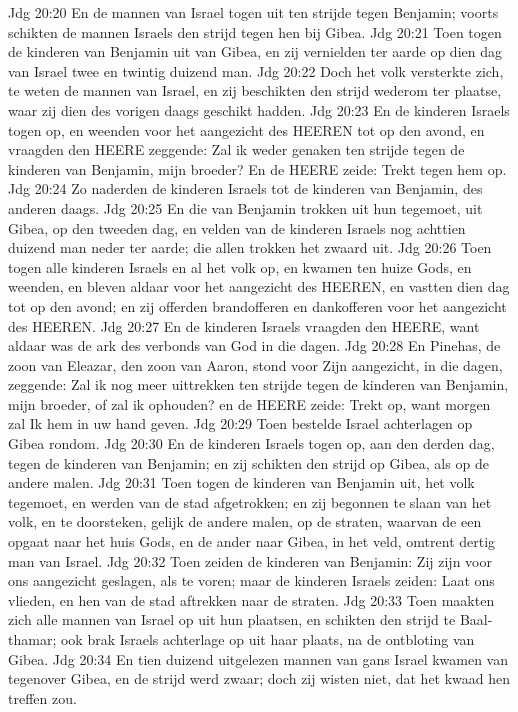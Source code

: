 Jdg 20:20  En de mannen van Israel togen uit ten strijde tegen Benjamin; voorts schikten de mannen Israels den strijd tegen hen bij Gibea.
Jdg 20:21  Toen togen de kinderen van Benjamin uit van Gibea, en zij vernielden ter aarde op dien dag van Israel twee en twintig duizend man.
Jdg 20:22  Doch het volk versterkte zich, te weten de mannen van Israel, en zij beschikten den strijd wederom ter plaatse, waar zij dien des vorigen daags geschikt hadden.
Jdg 20:23  En de kinderen Israels togen op, en weenden voor het aangezicht des HEEREN tot op den avond, en vraagden den HEERE zeggende: Zal ik weder genaken ten strijde tegen de kinderen van Benjamin, mijn broeder? En de HEERE zeide: Trekt tegen hem op.
Jdg 20:24  Zo naderden de kinderen Israels tot de kinderen van Benjamin, des anderen daags.
Jdg 20:25  En die van Benjamin trokken uit hun tegemoet, uit Gibea, op den tweeden dag, en velden van de kinderen Israels nog achttien duizend man neder ter aarde; die allen trokken het zwaard uit.
Jdg 20:26  Toen togen alle kinderen Israels en al het volk op, en kwamen ten huize Gods, en weenden, en bleven aldaar voor het aangezicht des HEEREN, en vastten dien dag tot op den avond; en zij offerden brandofferen en dankofferen voor het aangezicht des HEEREN.
Jdg 20:27  En de kinderen Israels vraagden den HEERE, want aldaar was de ark des verbonds van God in die dagen.
Jdg 20:28  En Pinehas, de zoon van Eleazar, den zoon van Aaron, stond voor Zijn aangezicht, in die dagen, zeggende: Zal ik nog meer uittrekken ten strijde tegen de kinderen van Benjamin, mijn broeder, of zal ik ophouden? en de HEERE zeide: Trekt op, want morgen zal Ik hem in uw hand geven.
Jdg 20:29  Toen bestelde Israel achterlagen op Gibea rondom.
Jdg 20:30  En de kinderen Israels togen op, aan den derden dag, tegen de kinderen van Benjamin; en zij schikten den strijd op Gibea, als op de andere malen.
Jdg 20:31  Toen togen de kinderen van Benjamin uit, het volk tegemoet, en werden van de stad afgetrokken; en zij begonnen te slaan van het volk, en te doorsteken, gelijk de andere malen, op de straten, waarvan de een opgaat naar het huis Gods, en de ander naar Gibea, in het veld, omtrent dertig man van Israel.
Jdg 20:32  Toen zeiden de kinderen van Benjamin: Zij zijn voor ons aangezicht geslagen, als te voren; maar de kinderen Israels zeiden: Laat ons vlieden, en hen van de stad aftrekken naar de straten.
Jdg 20:33  Toen maakten zich alle mannen van Israel op uit hun plaatsen, en schikten den strijd te Baal-thamar; ook brak Israels achterlage op uit haar plaats, na de ontbloting van Gibea.
Jdg 20:34  En tien duizend uitgelezen mannen van gans Israel kwamen van tegenover Gibea, en de strijd werd zwaar; doch zij wisten niet, dat het kwaad hen treffen zou.
